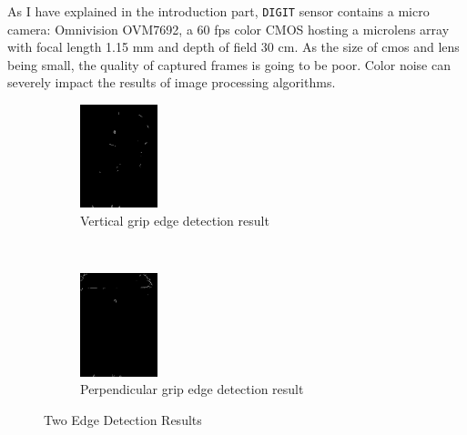 As I have explained in the introduction part, \texttt{DIGIT} sensor contains a micro camera: Omnivision OVM7692, a 60 fps color CMOS hosting a microlens array with focal length 1.15 mm and depth of field
30 cm. As the size of cmos and lens being small, the quality of captured frames is going to be poor. Color noise can severely impact the results of image processing algorithms.
\begin{figure}[t]
	\centering
	\begin{subfigure}[t]{0.45\textwidth}
		\centering
		\includegraphics[height=3cm]{fig/vertical_edge.jpg} %
		\caption{Vertical grip edge detection result}
	\end{subfigure}
	~ %
	\begin{subfigure}[t]{0.45\textwidth}
		\centering
		\includegraphics[height=3cm]{fig/perpendicular_edge.jpg} %
		\caption{Perpendicular grip edge detection result}
	\end{subfigure}
	\caption{Two Edge Detection Results}
	\label{fig:edgedetection}
\end{figure}


